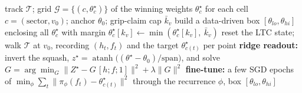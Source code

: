 %

\begin{algorithm}[t]
\caption{Offline warm start: fit the weight policy to the situation grid}
\label{alg:gridfit}
\begin{algorithmic}[1]
\Require track $\mathcal{T}$; grid $\mathcal{G}=\{(c,\theta^\star_c)\}$ of the
  winning weights $\theta^\star_c$ for each cell $c=(\text{sector},v_0)$;
  anchor $\theta_0$; grip-claim cap $\bar k_v$
\State build a data-driven box $[\theta_{lo},\theta_{hi}]$ enclosing all
  $\theta^\star_c$ with margin
 
  \State $\theta^\star_c[k_v] \gets \min(\theta^\star_c[k_v],\ \bar k_v)$
\EndFor
{} 
  \State reset the LTC state; walk $\mathcal{T}$ at $v_0$, recording
    $(h_t,f_t)$ and the target $\theta^\star_{c(t)}$ per point
\EndFor
\State \textbf{ridge readout:} invert the squash,
  $z^\star=\operatorname{atanh}\!\big((\theta^\star-\theta_0)/\text{span}\big)$,
  and solve $G=\arg\min_G \lVert Z^\star-G\,[h;f;1]\rVert^2+\lambda\lVert G\rVert^2$
\State \textbf{fine-tune:} a few SGD epochs of
  $\min_\phi \sum_t \lVert \pi_\phi(f_t)-\theta^\star_{c(t)}\rVert^2$
  through the recurrence
\State \Return $\phi$, box $[\theta_{lo},\theta_{hi}]$
\end{algorithmic}
\end{algorithm}

